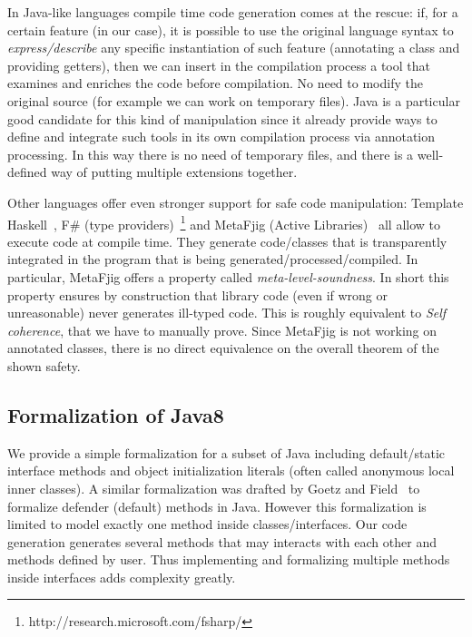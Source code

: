 In Java-like languages compile time code generation comes at the rescue: if, for a certain feature
(\mixin in our case), it is possible to use the original language syntax to
\emph{express/describe} any specific instantiation of such feature (annotating a
class and providing getters), then we can insert in the compilation process a tool
that examines and enriches the code before compilation. No need to modify the
original source (for example we can work on temporary files). 
Java is a particular
good candidate for this kind of manipulation since it already provide ways to
define and integrate such tools in its own compilation process via annotation
processing. In this way
there is no need of temporary files, and there is a well-defined way of putting
multiple extensions together.

Other languages offer even stronger support for safe code manipulation:
Template Haskell~\cite{sheard2002template}, F\# (type providers)~\footnote{http://research.microsoft.com/fsharp/} and MetaFjig (Active Libraries)~\cite{servetto2010metafjig}
all allow to execute code at compile time. They generate code/classes that is transparently integrated in the program that is being generated/processed/compiled. In particular, MetaFjig offers a property called \emph{meta-level-soundness}. In short this property ensures by construction that library code (even if wrong or unreasonable) never generates ill-typed code. This is roughly equivalent to 
\textit{Self coherence}, that we have to manually prove.
Since MetaFjig is not working on annotated classes, there is no direct
equivalence on the overall theorem of the shown safety.

\subsection{Formalization of Java8}
We provide a simple formalization for a subset of Java including default/static
interface methods and object initialization literals (often called anonymous
local inner classes).  A similar formalization was drafted by Goetz and
Field~\cite{goetz12fdefenders} to formalize defender (default) methods in
Java. However this formalization is limited to model exactly one method inside
classes/interfaces. Our code generation generates several methods that may
interacts with each other and methods defined by user. Thus implementing and
formalizing multiple methods inside interfaces adds complexity greatly.
